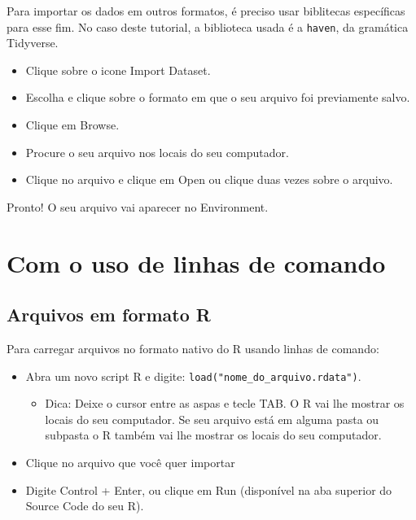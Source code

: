 \documentclass[
  brazil,
]{book}
\providecommand{\tightlist}{%
  \setlength{\itemsep}{0pt}\setlength{\parskip}{0pt}}
\begin{document}
Para importar os dados em outros formatos, é preciso usar biblitecas específicas para esse fim. No caso deste tutorial, a biblioteca usada é a \texttt{haven}, da gramática Tidyverse.

\begin{itemize}
\tightlist
\item
  Clique sobre o icone Import Dataset.
\item
  Escolha e clique sobre o formato em que o seu arquivo foi previamente salvo.
\item
  Clique em Browse.
\item
  Procure o seu arquivo nos locais do seu computador.
\item
  Clique no arquivo e clique em Open ou clique duas vezes sobre o arquivo.
\end{itemize}

Pronto! O seu arquivo vai aparecer no Environment.

\hypertarget{com-o-uso-de-linhas-de-comando}{%
\section{Com o uso de linhas de comando}\label{com-o-uso-de-linhas-de-comando}}

\hypertarget{arquivos-em-formato-r-1}{%
\subsection{Arquivos em formato R}\label{arquivos-em-formato-r-1}}

Para carregar arquivos no formato nativo do R usando linhas de comando:

\begin{itemize}
\tightlist
\item
  Abra um novo script R e digite: \texttt{load("nome\_do\_arquivo.rdata")}.

  \begin{itemize}
  \tightlist
  \item
    Dica: Deixe o cursor entre as aspas e tecle TAB. O R vai lhe mostrar os locais do seu computador. Se seu arquivo está em alguma pasta ou subpasta o R também vai lhe mostrar os locais do seu computador.
  \end{itemize}
\item
  Clique no arquivo que você quer importar
\item
  Digite Control + Enter, ou clique em Run (disponível na aba superior do Source Code do seu R).
\end{itemize}
\end{document}

